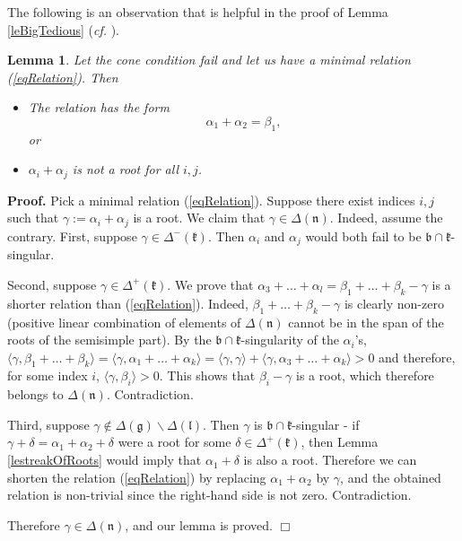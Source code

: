 \documentclass[12pt]{report}
\newtheorem{lemma}[theo]{Lemma}
\newenvironment{proof}[1][]{ \textbf{Proof#1. }}{$\Box$\medskip}
\newcommand{\kk}{\mathfrak{k}}
\newcommand{\nn}{\mathfrak{n}}
\newcommand{\gG}{\mathfrak{g}}
\newcommand{\bb}{\mathfrak{b}}
\newcommand{\lL}{\mathfrak{l}}
\newcommand{\refle}[1]{Lemma \ref{#1}}
\newcommand{\refeq}[1]{(\ref{#1})}
\begin{document}
The following is an observation that is helpful in the proof of Lemma \ref{leBigTedious} (\textit{cf.} \cite[Lemma 5.4]{PSZ}).
\begin{lemma}\label{leminrelationgeneral}
Let the cone condition fail and let us have a minimal relation \refeq{eqRelation}. Then
\begin{itemize}
\item[(a)] The relation has the form 
\[
\alpha_1+\alpha_2=\beta_1,
\] 
or 
\item[(b)] $\alpha_i+\alpha_j$ is not a root for all $i,j$.
\end{itemize}
\end{lemma}
\begin{proof}
Pick a minimal relation \refeq{eqRelation}. Suppose there exist indices $i,j$ such that $\gamma:=\alpha_i+\alpha_j$ is a root. We claim that $\gamma\in \Delta(\nn)$. Indeed, assume the contrary. First, suppose $\gamma\in\Delta^-(\kk)$. Then $\alpha_i$ and $\alpha_j$ would both fail to be $\bb\cap\kk$-singular. 

Second, suppose $\gamma\in\Delta^+(\kk)$. We prove that $\alpha_3+\dots+\alpha_l=\beta_1+\dots +\beta_k-\gamma$ is a shorter relation than \refeq{eqRelation}. Indeed, $\beta_1+\dots +\beta_k-\gamma$ is clearly non-zero (positive linear combination of elements of $\Delta(\nn)$ cannot be in the span of the roots of the semisimple part). By the $\bb\cap\kk$-singularity of the $\alpha_i$'s,   $\langle\gamma, \beta_1+\dots+ \beta_k\rangle =\langle\gamma,\alpha_1 +\dots +\alpha_k\rangle =\langle \gamma, \gamma \rangle +\langle \gamma, \alpha_3 +\dots + \alpha_k \rangle>0$ and therefore, for some index $i$,  $\langle\gamma,\beta_i\rangle>0$. This shows that $\beta_i-\gamma$ is a root, which therefore belongs to $\Delta(\nn)$. Contradiction.

Third, suppose $\gamma\notin\Delta(\gG)\backslash\Delta(\lL)$. Then $\gamma$ is $\bb\cap\kk$-singular - if $\gamma+ \delta = \alpha_1 + \alpha_2+\delta$ were a root for some $\delta\in\Delta^+(\kk)$, then \refle{lestreakOfRoots} would imply that $\alpha_1+\delta$ is also a root. Therefore we can shorten the relation \refeq{eqRelation} by replacing $\alpha_1+\alpha_2$ by $\gamma$, and the obtained relation is non-trivial since the right-hand side is not zero. Contradiction.

Therefore $\gamma\in \Delta(\nn)$, and our lemma is proved.
\end{proof}
\end{document}
